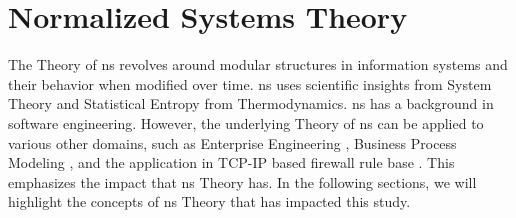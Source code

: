 \section{Normalized Systems Theory} \label{sec_ns_theory}

The Theory of \gls{ns} revolves around modular structures in information systems and their
behavior when modified over time. \gls{ns} uses scientific insights from System Theory and
Statistical Entropy from Thermodynamics. \gls{ns} has a background in software
engineering. However, the underlying Theory of \gls{ns} can be applied to various other
domains, such as Enterprise Engineering \parencite{huysmans_towards_2013}, Business
Process Modeling \parencite{van_nuel_towards_2011}, and the application in TCP-IP based
firewall rule base \parencite{haerens_evolvability_2021}. This emphasizes the impact that
\gls{ns} Theory has. In the following sections, we will highlight the concepts of
\gls{ns} Theory that has impacted this study.






